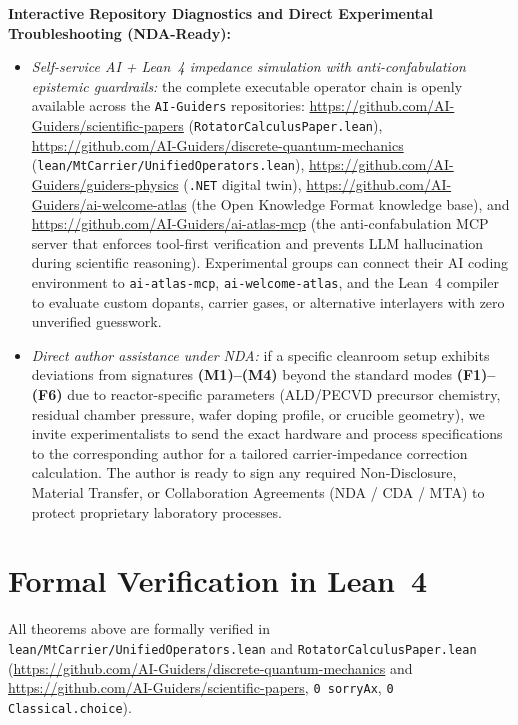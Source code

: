 \documentclass[11pt,a4paper]{article}
\theoremstyle{plain}
\theoremstyle{definition}
\begin{document}
\noindent\textbf{Interactive Repository Diagnostics and Direct Experimental Troubleshooting (NDA-Ready):}
\begin{itemize}[leftmargin=*,noitemsep]
\item \emph{Self-service AI + Lean~4 impedance simulation with anti-confabulation epistemic guardrails:} the complete executable operator chain is openly available across the \texttt{AI-Guiders} repositories: \url{https://github.com/AI-Guiders/scientific-papers} (\texttt{RotatorCalculusPaper.lean}), \url{https://github.com/AI-Guiders/discrete-quantum-mechanics} (\texttt{lean/MtCarrier/UnifiedOperators.lean}), \url{https://github.com/AI-Guiders/guiders-physics} (\texttt{.NET} digital twin), \url{https://github.com/AI-Guiders/ai-welcome-atlas} (the Open Knowledge Format knowledge base), and \url{https://github.com/AI-Guiders/ai-atlas-mcp} (the anti-confabulation MCP server that enforces tool-first verification and prevents LLM hallucination during scientific reasoning). Experimental groups can connect their AI coding environment to \texttt{ai-atlas-mcp}, \texttt{ai-welcome-atlas}, and the Lean~4 compiler to evaluate custom dopants, carrier gases, or alternative interlayers with zero unverified guesswork.
\item \emph{Direct author assistance under NDA:} if a specific cleanroom setup exhibits deviations from signatures \textbf{(M1)--(M4)} beyond the standard modes \textbf{(F1)--(F6)} due to reactor-specific parameters (ALD/PECVD precursor chemistry, residual chamber pressure, wafer doping profile, or crucible geometry), we invite experimentalists to send the exact hardware and process specifications to the corresponding author for a tailored carrier-impedance correction calculation. The author is ready to sign any required Non-Disclosure, Material Transfer, or Collaboration Agreements (NDA / CDA / MTA) to protect proprietary laboratory processes.
\end{itemize}

\section{Formal Verification in Lean~4}
All theorems above are formally verified in \texttt{lean/MtCarrier/UnifiedOperators.lean} and \texttt{RotatorCalculusPaper.lean} (\url{https://github.com/AI-Guiders/discrete-quantum-mechanics} and \url{https://github.com/AI-Guiders/scientific-papers}, \texttt{0 sorryAx}, \texttt{0 Classical.choice}).
\end{document}
